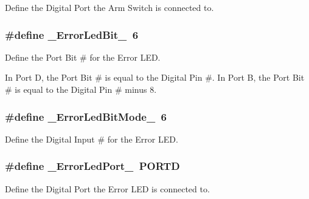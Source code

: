 \-Define the \-Digital \-Port the \-Arm \-Switch is connected to. 

\hypertarget{remotePanel_8ino_a5504a284db73f254a1d5871844f6987c}{
\subsubsection[{\-\_\-\-Error\-Led\-Bit\-\_\-}]{\setlength{\rightskip}{0pt plus 5cm}\#define {\bf \-\_\-\-Error\-Led\-Bit\-\_\-}~6}}\label{remotePanel_8ino_a5504a284db73f254a1d5871844f6987c}


\-Define the \-Port \-Bit \# for the \-Error \-L\-E\-D. 

\-In \-Port \-D, the \-Port \-Bit \# is equal to the \-Digital \-Pin \#. \-In \-Port \-B, the \-Port \-Bit \# is equal to the \-Digital \-Pin \# minus 8. \hypertarget{remotePanel_8ino_afff5f53ef0f1c562a5dce2243aef6c53}{
\subsubsection[{\-\_\-\-Error\-Led\-Bit\-Mode\-\_\-}]{\setlength{\rightskip}{0pt plus 5cm}\#define {\bf \-\_\-\-Error\-Led\-Bit\-Mode\-\_\-}~6}}\label{remotePanel_8ino_afff5f53ef0f1c562a5dce2243aef6c53}


\-Define the \-Digital \-Input \# for the \-Error \-L\-E\-D. 

\hypertarget{remotePanel_8ino_affac57d4321e3e0a2ffd81bce3d8ac87}{
\subsubsection[{\-\_\-\-Error\-Led\-Port\-\_\-}]{\setlength{\rightskip}{0pt plus 5cm}\#define {\bf \-\_\-\-Error\-Led\-Port\-\_\-}~\-P\-O\-R\-T\-D}}\label{remotePanel_8ino_affac57d4321e3e0a2ffd81bce3d8ac87}


\-Define the \-Digital \-Port the \-Error \-L\-E\-D is connected to. 

